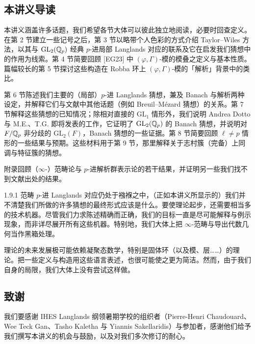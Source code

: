 \subsection{本讲义导读}

本讲义涵盖许多话题，我们希望各节大体可以彼此独立地阅读，必要时回查定义。在第 2 节建立一些记号之后，第 3 节以略带个人色彩的方式介绍 Taylor--Wiles 方法，以其与 $\mathrm{GL}_2(\mathbb{Q}_p)$ 经典 $p$-进局部 Langlands 对应的联系及它在启发我们猜想中的作用为线索。第 4 节简要回顾 [EG23] 中 $(\varphi,\Gamma)$-模的模叠之定义与基本性质。篇幅较长的第 5 节探讨这些构造在 Robba 环上 $(\varphi,\Gamma)$-模的「解析」背景中的类比。

第 6 节陈述我们主要的（局部）$p$-进 Langlands 猜想，兼及 Banach 与解析两种设定，并解释它们与文献中其他话题（例如 Breuil--Mézard 猜想）的关系。第 7 节解释这些猜想的已知情况；除相对直接的 $\mathrm{GL}_1$ 情形外，我们说明 Andrea Dotto 与 M.E.、T.G. 即将发表的工作，它证明了 $\mathrm{GL}_2(\mathbb{Q}_p)$ 的 Banach 猜想，并说明对 $F/\mathbb{Q}_p$ 非分歧的 $\mathrm{GL}_2(F)$，Banach 猜想的一些证据。第 8 节简要回顾 $\ell\neq p$ 情形的一些结果与预期。这些材料用于第 9 节，那里解释关于志村簇（完备）上同调与特征簇的猜想。

附录回顾（$\infty$-）范畴论与 $p$-进解析群表示论的若干结果，并证明另一些我们找不到文献出处的结果。

\begin{rem}{1.9.1}\label{rem:a4-1-9-1}
范畴 $p$-进 Langlands 对应仍处于襁褓之中，（正如本讲义所显示的）我们并不清楚我们所做的许多猜想的最终形式应该是什么。要使理论起步，还需要相当多的技术机器。尽管我们力求陈述精确而正确，我们的目标一直是尽可能解释与例示现象，而非详尽展开所有这些机器。特别地，我们大体上把 $\infty$-范畴与导出代数几何当作黑箱处理。

理论的未来发展极可能依赖凝聚态数学，特别是固体环（以及模、层……）的理论。把一些定义与构造用这些语言表述，也很可能使之更为简洁。然而，由于我们自身的局限，我们大体上没有尝试这样做。
\end{rem}

\subsection{致谢}

我们要感谢 IHES Langlands 纲领暑期学校的组织者（Pierre-Henri Chaudouard、Wee Teck Gan、Tasho Kaletha 与 Yiannis Sakellaridis）与参加者，感谢他们给予我们撰写本讲义的机会与鼓励，以及对我们多次修订的耐心。

